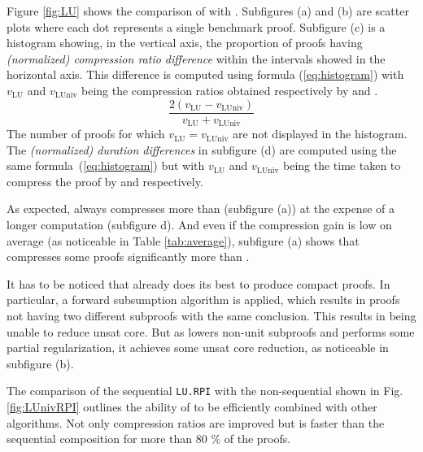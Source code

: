 \documentclass{llncs}
\begin{document}
\newcommand{\va}[1]{\ensuremath{v_{\text{#1}}}}

Figure \ref{fig:LU} shows the comparison of {\LowerUnits} with {\LowerUnivalents}. Subfigures (a) and (b) are scatter plots where each dot represents a single benchmark proof. 
Subfigure (c) is a histogram showing, in the vertical axis, the proportion of proofs having \emph{(normalized) compression ratio difference} within the intervals showed in the horizontal axis. This difference is computed using formula (\ref{eq:histogram}) with \va{LU}
and \va{LUniv} being the compression ratios obtained respectively by {\LowerUnits} and
{\LowerUnivalents}.
\begin{equation} \label{eq:histogram}
  \frac { 2(\va{LU} - \va{LUniv}) }{ \va{LU} + \va{LUniv} }
\end{equation}
The number of proofs for which $\va{LU} = \va{LUniv}$ are not displayed in the histogram.
The \emph{(normalized) duration differences} in subfigure (d) are computed using the same formula~(\ref{eq:histogram}) but
with \va{LU} and \va{LUniv} being the time taken to compress the proof by {\LowerUnits} and
{\LowerUnits} respectively.



As expected, {\LowerUnivalents} always compresses more than {\LowerUnits} (subfigure (a)) at the expense of a longer
computation (subfigure d). And even if the compression gain is low on average (as noticeable in Table \ref{tab:average}), subfigure (a) shows that {\LowerUnivalents} compresses some proofs significantly more than {\LowerUnits}.

It has to be noticed that \veriT already does its best to produce compact proofs. In particular,
a forward subsumption algorithm is applied, which results in proofs not having two different subproofs
with the same conclusion. This results in {\LowerUnits} being unable to reduce unsat core.
But as {\LowerUnivalents} lowers non-unit subproofs and performs some partial regularization, it
achieves some unsat core reduction, as noticeable in subfigure (b).

The comparison of the sequential \texttt{LU.RPI} with the non-sequential {\LUnivRPI} shown in Fig.
\ref{fig:LUnivRPI} outlines the ability of {\LowerUnivalents} to be efficiently combined with other
algorithms. Not only compression ratios are improved but {\LUnivRPI} is faster than the sequential
composition for more than 80 \% of the proofs.




\end{document}
